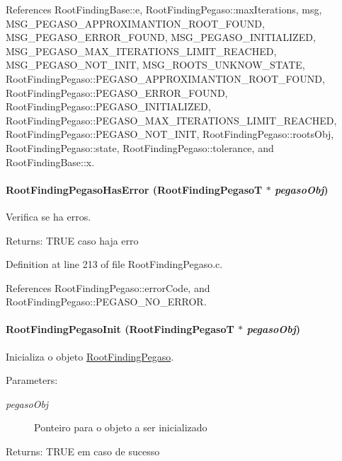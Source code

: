 References RootFindingBase::e, RootFindingPegaso::maxIterations, msg, MSG\_\-PEGASO\_\-APPROXIMANTION\_\-ROOT\_\-FOUND, MSG\_\-PEGASO\_\-ERROR\_\-FOUND, MSG\_\-PEGASO\_\-INITIALIZED, MSG\_\-PEGASO\_\-MAX\_\-ITERATIONS\_\-LIMIT\_\-REACHED, MSG\_\-PEGASO\_\-NOT\_\-INIT, MSG\_\-ROOTS\_\-UNKNOW\_\-STATE, RootFindingPegaso::PEGASO\_\-APPROXIMANTION\_\-ROOT\_\-FOUND, RootFindingPegaso::PEGASO\_\-ERROR\_\-FOUND, RootFindingPegaso::PEGASO\_\-INITIALIZED, RootFindingPegaso::PEGASO\_\-MAX\_\-ITERATIONS\_\-LIMIT\_\-REACHED, RootFindingPegaso::PEGASO\_\-NOT\_\-INIT, RootFindingPegaso::rootsObj, RootFindingPegaso::state, RootFindingPegaso::tolerance, and RootFindingBase::x.\hypertarget{group____pegaso_g3159b35cddebb0bdc99b85199fbc847f}{
\paragraph[RootFindingPegasoHasError]{ RootFindingPegasoHasError ({\bf RootFindingPegasoT} $\ast$ {\em pegasoObj})}\hfill}
\label{group____pegaso_g3159b35cddebb0bdc99b85199fbc847f}


Verifica se ha erros. 

\begin{Desc}
\item[Returns:]TRUE caso haja erro \end{Desc}


Definition at line 213 of file RootFindingPegaso.c.

References RootFindingPegaso::errorCode, and RootFindingPegaso::PEGASO\_\-NO\_\-ERROR.\hypertarget{group____pegaso_gf4d7f58905c8f5ed3ed3feb77c71b7cc}{
\paragraph[RootFindingPegasoInit]{ RootFindingPegasoInit ({\bf RootFindingPegasoT} $\ast$ {\em pegasoObj})}\hfill}
\label{group____pegaso_gf4d7f58905c8f5ed3ed3feb77c71b7cc}


Inicializa o objeto \hyperlink{structRootFindingPegaso}{RootFindingPegaso}. 

\begin{Desc}
\item[Parameters:]
\begin{description}
\item[{\em pegasoObj}]Ponteiro para o objeto a ser inicializado \end{description}
\end{Desc}
\begin{Desc}
\item[Returns:]TRUE em caso de sucesso \end{Desc}


